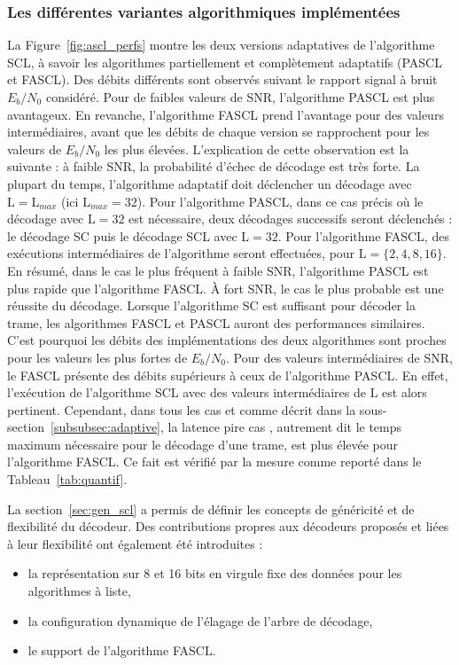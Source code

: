 \subsubsection{Les différentes variantes algorithmiques implémentées}
La Figure~\ref{fig:ascl_perfs} montre les deux versions adaptatives de l'algorithme SCL, à savoir les algorithmes partiellement et complètement adaptatifs (PASCL et FASCL). Des débits différents sont observés suivant le rapport signal à bruit $E_b/N_0$ considéré. Pour de faibles valeurs de SNR, l'algorithme PASCL est plus avantageux. En revanche, l'algorithme FASCL prend l'avantage pour des valeurs intermédiaires, avant que les débits de chaque version se rapprochent pour les valeurs de $E_b/N_0$ les plus élevées.
L'explication de cette observation est la suivante : à faible SNR, la probabilité d'échec de décodage est très forte. La plupart du temps, l'algorithme adaptatif doit déclencher un décodage avec $\mathrm{L}=\mathrm{L}_{max}$ (ici $\mathrm{L}_{max}=32$). Pour l'algorithme PASCL, dans ce cas précis où le décodage avec $\mathrm{L}=32$ est nécessaire, deux décodages successifs seront déclenchés : le décodage SC puis le décodage SCL avec $\mathrm{L}=32$. Pour l'algorithme FASCL, des exécutions intermédiaires de l'algorithme seront effectuées, pour $\mathrm{L}=\{2,4,8,16\}$. En résumé, dans le cas le plus fréquent à faible SNR, l'algorithme PASCL est plus rapide que l'algorithme FASCL.
\`A fort SNR, le cas le plus probable est une réussite du décodage. Lorsque l'algorithme SC est suffisant pour décoder la trame, les algorithmes FASCL et PASCL auront des performances similaires. C'est pourquoi les débits des implémentations des deux algorithmes sont proches pour les valeurs les plus fortes de $E_b/N_0$. Pour des valeurs intermédiaires de SNR, le FASCL présente des débits supérieurs à ceux de l'algorithme PASCL. En effet, l'exécution de l'algorithme SCL avec des valeurs intermédiaires de $\mathrm{L}$ est alors pertinent. Cependant, dans tous les cas et comme décrit dans la sous-section~\ref{subsubsec:adaptive}, la latence \og pire cas \fg, autrement dit le temps maximum nécessaire pour le décodage d'une trame, est plus élevée pour l'algorithme FASCL. Ce fait est vérifié par la mesure comme reporté dans le Tableau~\ref{tab:quantif}.

La section~\ref{sec:gen_scl} a permis de définir les concepts de généricité et de flexibilité du décodeur. Des contributions propres aux décodeurs proposés et liées à leur flexibilité ont également été introduites :

\begin{itemize}
  \item la représentation sur 8 et 16 bits en virgule fixe des données pour les algorithmes à liste,
  \item la configuration dynamique de l'élagage de l'arbre de décodage,
  \item le support de l'algorithme FASCL.
\end{itemize}

